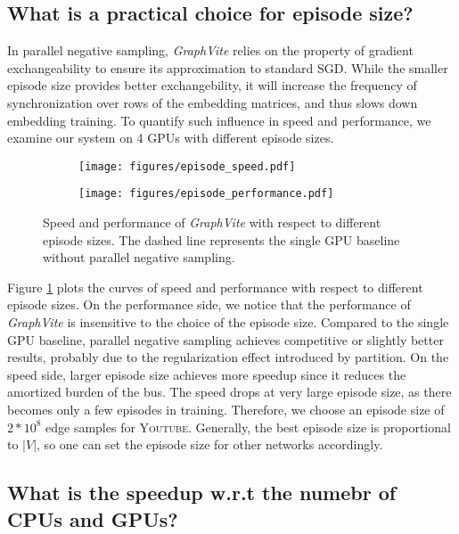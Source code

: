 \documentclass[sigconf]{acmart}
\newcommand{\dataset}[1]{\textsc{#1}\xspace}
\newcommand{\Graphy}{\textit{GraphVite}\xspace}
\begin{document}
\subsection{What is a practical choice for episode size?}
\label{sec:exchangeability}

In parallel negative sampling, \Graphy relies on the property of gradient exchangeability to ensure its approximation to standard SGD. While the smaller episode size provides better exchangebility, it will increase the frequency of synchronization over rows of the embedding matrices, and thus slows down embedding training. To quantify such influence in speed and performance, we examine our system on 4 GPUs with different episode sizes. 

\begin{figure}[!h]
    \centering
    \begin{subfigure}{0.23\textwidth}
        \texttt{[image: figures/episode\_speed.pdf]}
    \end{subfigure}
    \begin{subfigure}{0.23\textwidth}
        \texttt{[image: figures/episode\_performance.pdf]}
    \end{subfigure}
    \caption{Speed and performance of \Graphy with respect to different episode sizes. The dashed line represents the single GPU baseline without parallel negative sampling.}
    \label{fig:episode_size}
\end{figure}

Figure \ref{fig:episode_size} plots the curves of speed and performance with respect to different episode sizes. On the performance side, we notice that the performance of \Graphy is insensitive to the choice of the episode size. Compared to the single GPU baseline, parallel negative sampling achieves competitive or slightly better results, probably due to the regularization effect introduced by partition. On the speed side, larger episode size achieves more speedup since it reduces the amortized burden of the bus. The speed drops at very large episode size, as there becomes only a few episodes in training. Therefore, we choose an episode size of $2*10^8$ edge samples for \dataset{Youtube}. Generally, the best episode size is proportional to $|V|$, so one can set the episode size for other networks accordingly.

\subsection{What is the speedup w.r.t the numebr of CPUs and GPUs?}
\end{document}
